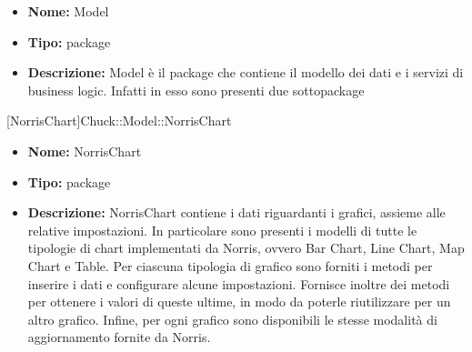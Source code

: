 			\begin{itemize}
			\item \textbf{Nome:} Model
			\item \textbf{Tipo:} package
			
			\item \textbf{Descrizione:} Model è il package che contiene il modello dei dati e i servizi di business logic. Infatti in esso sono presenti due sottopackage
			\end{itemize}

			
			[NorrisChart]{Chuck::Model::NorrisChart}
			

	

			\begin{itemize}
			\item \textbf{Nome:} NorrisChart
			\item \textbf{Tipo:} package
			
			\item \textbf{Descrizione:} NorrisChart contiene i dati riguardanti i grafici, assieme alle relative impostazioni. In particolare sono presenti i modelli di tutte le tipologie di chart implementati da Norris, ovvero Bar Chart, Line Chart, Map Chart e Table. Per ciascuna tipologia di grafico sono forniti i metodi per inserire i dati e configurare alcune impostazioni. Fornisce inoltre dei metodi per ottenere i valori di queste ultime, in modo da poterle riutilizzare per un altro grafico. Infine, per ogni grafico sono disponibili le stesse modalità di aggiornamento fornite da Norris.
			\end{itemize}

